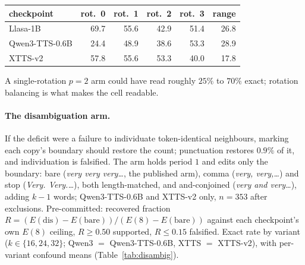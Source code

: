 \par\medskip\noindent\begin{minipage}{\columnwidth}
\label{tab:rotation}
\centering
\begin{tabular}{@{}lrrrrr@{}}
\toprule
checkpoint & rot.\ 0 & rot.\ 1 & rot.\ 2 & rot.\ 3 & range \\
\midrule
Llasa-1B         & 69.7 & 55.6 & 42.9 & 51.4 & 26.8 \\
Qwen3-TTS-0.6B   & 24.4 & 48.9 & 38.6 & 53.3 & 28.9 \\
XTTS-v2          & 57.8 & 55.6 & 53.3 & 40.0 & 17.8 \\
\bottomrule
\end{tabular}
\end{minipage}\par\medskip


\noindent A single-rotation $p{=}2$ arm could have read roughly $25\%$
to $70\%$ exact; rotation balancing is what makes the cell readable.

\paragraph{The disambiguation arm.} If the deficit were a failure to
individuate token-identical neighbours, marking each copy's boundary
should restore the count; punctuation restores $0.9\%$ of it, and
individuation is falsified. The arm holds period $1$ and edits only
the boundary: bare (\emph{very very very\ldots}, the published arm),
comma (\emph{very, very,\ldots}) and stop (\emph{Very. Very.\ldots}),
both length-matched, and and-conjoined (\emph{very and very\ldots}),
adding $k-1$ words; Qwen3-TTS-0.6B and XTTS-v2 only, $n=353$ after
exclusions. Pre-committed: recovered fraction
$R=(E(\text{dis})-E(\text{bare}))/(E(8)-E(\text{bare}))$ against each
checkpoint's own $E(8)$ ceiling, $R\ge0.50$ supported, $R\le0.15$
falsified. Exact rate by variant ($k\in\{16,24,32\}$; Qwen3 $=$
Qwen3-TTS-0.6B, XTTS $=$ XTTS-v2), with per-variant confound means
(Table~\ref{tab:disambig}).

